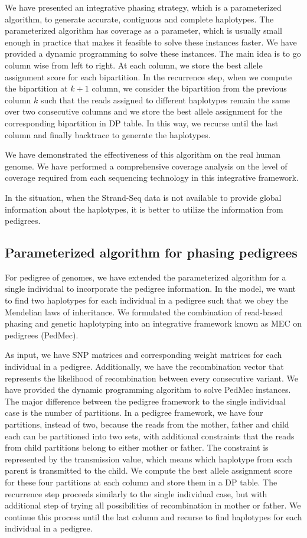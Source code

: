 We have presented an integrative phasing strategy, which is a parameterized algorithm, to generate accurate, contiguous and complete haplotypes. 
The parameterized algorithm has coverage as a parameter, which is usually small enough in practice that makes it feasible to solve these instances faster.
We have provided a dynamic programming to solve these instances. The main idea is to go column wise from left to right. At each column, we store the best allele assignment score for each bipartition.
In the recurrence step, when we compute the bipartition at $k+1$ column, we consider the bipartition from the previous column $k$ 
such that the reads assigned to different haplotypes remain the same over two consecutive columns and we store the best allele assignment for the corresponding bipartition in DP table.
In this way, we recurse until the last column and finally backtrace to generate the haplotypes.

We have demonstrated the effectiveness of this algorithm on the real human genome. 
We have performed a comprehensive coverage analysis on the level of coverage required from each sequencing technology in this integrative framework.

In the situation, when the Strand-Seq data is not available to provide global information about the haplotypes, it is better to utilize the information from pedigrees.
\subsection{Parameterized algorithm for phasing pedigrees}
For pedigree of genomes, we have extended the parameterized algorithm for a single individual to incorporate the pedigree information.
In the model, we want to find two haplotypes for each individual in a pedigree such that we obey the Mendelian laws of inheritance.
We formulated the combination of read-based phasing and genetic haplotyping into an integrative framework known as MEC on pedigrees (PedMec).

As input, we have SNP matrices and corresponding weight matrices for each individual in a pedigree. 
Additionally, we have the recombination vector that represents the likelihood of recombination between every consecutive variant.
We have provided the dynamic programming algorithm to solve PedMec instances.
The major difference between the pedigree framework to the single individual case is the number of partitions.
In a pedigree framework, we have four partitions, instead of two, because the reads from the mother, father and child each can be partitioned into two sets, 
with additional constraints that the reads from child partitions belong to either mother or father.
The constraint is represented by the transmission value, which means which haplotype from each parent is transmitted to the child.
We compute the best allele assignment score for these four partitions at each column and store them in a DP table.
The recurrence step proceeds similarly to the single individual case, but with additional step of trying all possibilities of recombination in mother or father.
We continue this process until the last column and recurse to find haplotypes for each individual in a pedigree.

